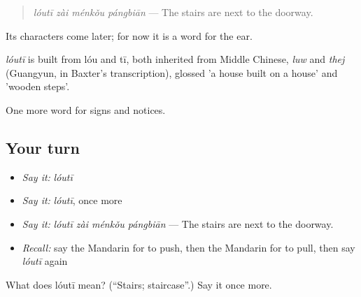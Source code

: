 \begin{quote}
\emph{lóutī zài ménkǒu pángbiān} — The stairs are next to the doorway.
\end{quote}

Its characters come later; for now it is a word for the ear.

\begin{cousinweb}
\emph{lóutī} is built from lóu and tī, both inherited from Middle Chinese, \emph{luw} and \emph{thej} (Guangyun, in Baxter's transcription), glossed 'a house built on a house' and 'wooden steps'.
\end{cousinweb}

\begin{grammarlens}[title={What you've built}]
One more word for signs and notices.
\end{grammarlens}

\subsection*{Your turn}
\begin{itemize}
\raggedright
  \item \emph{Say it:} \emph{lóutī}
  \item \emph{Say it:} \emph{lóutī}, once more
  \item \emph{Say it:} \emph{lóutī zài ménkǒu pángbiān} — The stairs are next to the doorway.
  \item \emph{Recall:} say the Mandarin for to push, then the Mandarin for to pull, then say \emph{lóutī} again
\end{itemize}

\begin{tcolorbox}[breakable,colback=teal!4,colframe=teal!35!black,title={Before you move on}]
What does lóutī mean? (\textquotedblleft{}Stairs; staircase\textquotedblright{}.) Say it once more.
\end{tcolorbox}
